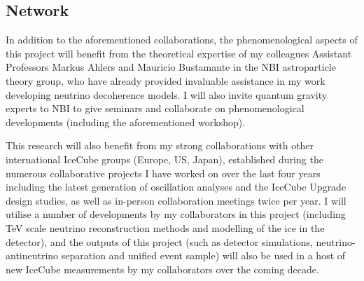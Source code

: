\documentclass[a4paper,11pt]{article}
\begin{document}
\subsection{Network}

In addition to the aforementioned collaborations, the phenomenological aspects of this project will benefit from the theoretical expertise of my colleagues Assistant Professors Markus Ahlers and Mauricio Bustamante in the NBI astroparticle theory group, who have already provided invaluable assistance in my work developing neutrino decoherence models. I will also invite quantum gravity experts to NBI to give seminars and collaborate on phenomenological developments (including the aforementioned workshop).

This research will also benefit from my strong collaborations with other international IceCube groups (Europe, US, Japan), established during the numerous collaborative projects I have worked on over the last four years including the latest generation of oscillation analyses and the IceCube Upgrade design studies, as well as in-person collaboration meetings twice per year. I will utilise a number of developments by my collaborators in this project (including TeV scale neutrino reconstruction methods and modelling of the ice in the detector), and the outputs of this project (such as detector simulations, neutrino-antineutrino separation and unified event sample) will also be used in a host of new IceCube measurements by my collaborators over the coming decade. \\





\vspace{0.3cm}


\end{document}

